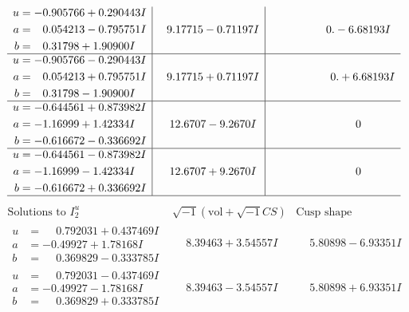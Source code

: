 \documentclass[1p]{elsarticle_modified}
\theoremstyle{definition}
\newcommand{\I}{\sqrt{-1}}
\begin{document}
$$\begin{array}{c|c|c}
\begin{aligned}
u &= -0.905766 + 0.290443 I \\
a &= \phantom{-}0.054213 - 0.795751 I \\
b &= \phantom{-}0.31798 + 1.90900 I\end{aligned}
 & \phantom{-}9.17715 - 0.71197 I & \phantom{-0.000000 } 0. - 6.68193 I \\ \hline\begin{aligned}
u &= -0.905766 - 0.290443 I \\
a &= \phantom{-}0.054213 + 0.795751 I \\
b &= \phantom{-}0.31798 - 1.90900 I\end{aligned}
 & \phantom{-}9.17715 + 0.71197 I & \phantom{-0.000000 -}0. + 6.68193 I \\ \hline\begin{aligned}
u &= -0.644561 + 0.873982 I \\
a &= -1.16999 + 1.42334 I \\
b &= -0.616672 - 0.336692 I\end{aligned}
 & \phantom{-}12.6707 - 9.2670 I & \phantom{-0.000000 } 0 \\ \hline\begin{aligned}
u &= -0.644561 - 0.873982 I \\
a &= -1.16999 - 1.42334 I \\
b &= -0.616672 + 0.336692 I\end{aligned}
 & \phantom{-}12.6707 + 9.2670 I & \phantom{-0.000000 } 0\\
 \hline 
 \end{array}$$\newpage$$\begin{array}{c|c|c}  
\text{Solutions to }I^u_{2}& \I (\text{vol} + \sqrt{-1}CS) & \text{Cusp shape}\\
 \hline 
\begin{aligned}
u &= \phantom{-}0.792031 + 0.437469 I \\
a &= -0.49927 + 1.78168 I \\
b &= \phantom{-}0.369829 - 0.333785 I\end{aligned}
 & \phantom{-}8.39463 + 3.54557 I & \phantom{-}5.80898 - 6.93351 I \\ \hline\begin{aligned}
u &= \phantom{-}0.792031 - 0.437469 I \\
a &= -0.49927 - 1.78168 I \\
b &= \phantom{-}0.369829 + 0.333785 I\end{aligned}
 & \phantom{-}8.39463 - 3.54557 I & \phantom{-}5.80898 + 6.93351 I \\ \hline\begin{aligned}

\end{aligned}
\end{array}$$
\end{document}
